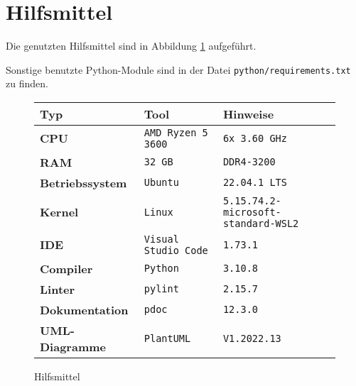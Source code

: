 \section{Hilfsmittel}
\label{sec:hilfsmittel}

Die genutzten Hilfsmittel sind in Abbildung \ref{tab:tools} aufgeführt.

Sonstige benutzte Python-Module sind in der Datei \texttt{python/requirements.txt} zu finden.

\begin{figure}[H]
    \centering
    \begin{tabular}{|l|l|l|}
        \hline
        \textbf{Typ}            & \textbf{Tool}               & \textbf{Hinweise}                          \\
        \hline
        \hline
        \textbf{CPU}            & \texttt{AMD Ryzen 5 3600}   & \texttt{6x 3.60 GHz}                       \\
        \hline
        \textbf{RAM}            & \texttt{32 GB}              & \texttt{DDR4-3200}                         \\
        \hline
        \hline
        \textbf{Betriebssystem} & \texttt{Ubuntu}             & \texttt{22.04.1 LTS}                       \\
        \hline
        \textbf{Kernel}         & \texttt{Linux}              & \texttt{5.15.74.2-microsoft-standard-WSL2} \\
        \hline
        \textbf{IDE}            & \texttt{Visual Studio Code} & \texttt{1.73.1}                            \\
        \hline
        \textbf{Compiler}       & \texttt{Python}             & \texttt{3.10.8}                            \\
        \hline
        \textbf{Linter}         & \texttt{pylint}             & \texttt{2.15.7}                            \\
        \hline
        \textbf{Dokumentation}  & \texttt{pdoc}               & \texttt{12.3.0}                            \\
        \hline
        \textbf{UML-Diagramme}  & \texttt{PlantUML}           & \texttt{V1.2022.13}                        \\
        \hline
    \end{tabular}
    \caption{Hilfsmittel}
    \label{tab:tools}
\end{figure}